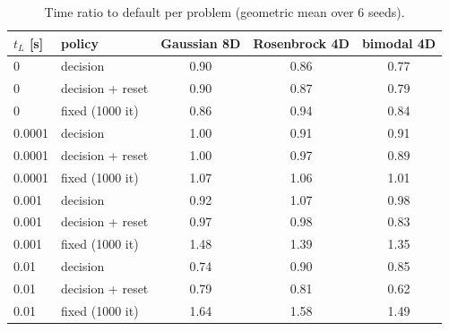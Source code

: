 \begin{table}[htbp]\centering
\caption{Time ratio to default per problem (geometric mean over 6 seeds).}
\label{tab:perproblem}
\begin{tabular}{llccc}
\toprule
$t_L$ [s] & policy & Gaussian 8D & Rosenbrock 4D & bimodal 4D \\
\midrule
0 & decision & 0.90 & 0.86 & 0.77 \\
0 & decision + reset & 0.90 & 0.87 & 0.79 \\
0 & fixed (1000 it) & 0.86 & 0.94 & 0.84 \\
0.0001 & decision & 1.00 & 0.91 & 0.91 \\
0.0001 & decision + reset & 1.00 & 0.97 & 0.89 \\
0.0001 & fixed (1000 it) & 1.07 & 1.06 & 1.01 \\
0.001 & decision & 0.92 & 1.07 & 0.98 \\
0.001 & decision + reset & 0.97 & 0.98 & 0.83 \\
0.001 & fixed (1000 it) & 1.48 & 1.39 & 1.35 \\
0.01 & decision & 0.74 & 0.90 & 0.85 \\
0.01 & decision + reset & 0.79 & 0.81 & 0.62 \\
0.01 & fixed (1000 it) & 1.64 & 1.58 & 1.49 \\
\bottomrule
\end{tabular}
\end{table}